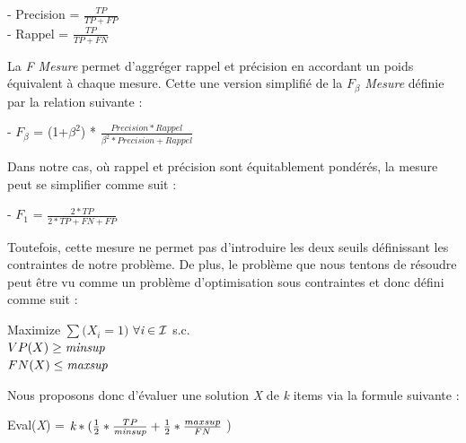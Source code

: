 \documentclass[a4paper,10pt]{report}
\begin{document}
\begin{center}
- Precision = $\frac{TP}{TP+FP}$ \\
\vspace{0.15cm}
- Rappel = $\frac{TP}{TP+FN}$\\
\end{center}

La \emph{F Mesure} permet d'aggréger rappel et précision en accordant un poids équivalent à chaque mesure. Cette une version simplifié de la \emph{$F_{\beta}$ Mesure} définie par la relation suivante : 
\begin{center}
- \emph{$F_{\beta}$} = (1+$\beta^{2}$) * $\frac{Precision*Rappel}{\beta^{2}*Precision + Rappel}$
\end{center}

Dans notre cas, où rappel et précision sont équitablement pondérés, la mesure peut se simplifier comme suit :

\begin{center}
- \emph{$F_{1}$} = $\frac{2*TP}{2*TP + FN + FP }$
\end{center}

Toutefois, cette mesure ne permet pas d'introduire les deux seuils définissant les contraintes de notre problème. De plus, le problème que nous tentons de résoudre peut être vu comme un problème d'optimisation sous contraintes et donc défini comme suit : \\

\begin{center}
	Maximize $\sum{(X_{i} = 1})$ $\forall \emph{i} \in \mathcal{I}$ s.c. \\
	$VP(X) \geq \emph{minsup}$ \\
	$FN(X) \leq \emph{maxsup}$
\end{center}

Nous proposons donc d'évaluer une solution \emph{X} de \emph{k} items via la formule suivante :

\begin{center}
	Eval(\emph{X}) = $\emph{k}* ( \frac{1}{2}*\frac{TP}{\emph{minsup}} + \frac{1}{2}*\frac{maxsup}{FN}$ )\\
\end{center}
\end{document}
